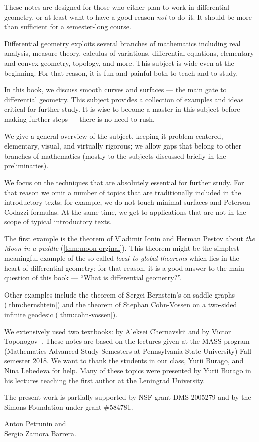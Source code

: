 \vfill

\newpage
{}
{}
\thispagestyle{myheadings}

These notes are designed for those who either plan to work in differential geometry,
or at least want to have a good reason {}\emph{not} to do~it.
It should be more than sufficient for a semester-long course. 

Differential geometry exploits several branches of mathematics including 
real analysis, 
measure theory,
calculus of variations,
differential equations,
elementary and convex geometry,
topology, and more.
This subject is wide even at the beginning. 
For that reason, it is fun and painful both to teach and to study.

In this book, we discuss smooth curves and surfaces --- the main gate to differential geometry.
This subject provides a collection of examples and ideas critical for further study.
It is wise to become a master in this subject before making further steps --- there is no need to rush.

We give a general overview of the subject, keeping it
problem-centered,
elementary, 
visual, 
and virtually rigorous; we allow gaps that belong to other branches of mathematics (mostly to the subjects discussed briefly in the preliminaries).

We focus on the techniques that are absolutely essential for further study.
For  that reason we omit a number of topics that are traditionally included in the introductory texts;
for example, we do not touch %
minimal surfaces and Peterson--Codazzi formulas.
At the same time, we get to applications
 that are not in the scope of typical introductory texts.
 
The first example is the theorem of Vladimir Ionin and Herman Pestov about {}\emph{the Moon in a puddle} (\ref{thm:moon-orginal}).
This theorem might be the simplest meaningful example of the so-called {}\emph{local to global theorems} which lies in the heart of differential geometry;
for that reason, it is a good answer to the main question of this book --- ``What is differential geometry?''.

Other examples include the theorem of Sergei Bernstein's on saddle graphs (\ref{thm:bernshtein}) and the theorem of Stephan Cohn-Vossen
on a two-sided infinite geodesic (\ref{thm:cohn-vossen}).

We extensively used two textbooks: by Aleksei Chernavskii \cite{chernavsky} and by Victor Toponogov~\cite{toponogov-book}.
These notes are based on the lectures given at the MASS program (Mathematics Advanced Study Semesters at Pennsylvania State University) Fall semester 2018.
We want to thank the students in our class, Yurii Burago, and Nina Lebedeva for help.
Many of these topics were presented by Yurii Burago in his lectures teaching the first author at the Leningrad University.

The present work is partially supported by NSF grant DMS-2005279
and by the Simons Foundation under grant \#584781.

\begin{flushright}
Anton Petrunin and\\
Sergio Zamora Barrera.
\end{flushright}




